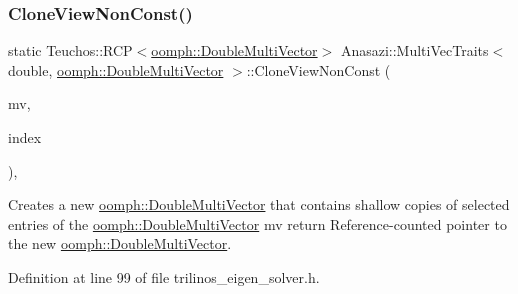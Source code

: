 \subsubsection{\texorpdfstring{Clone\+View\+Non\+Const()}{CloneViewNonConst()}\hspace{0.1cm}{\footnotesize\ttfamily [1/2]}}
{\footnotesize\ttfamily static Teuchos\+::\+R\+CP$<$\hyperlink{classoomph_1_1DoubleMultiVector}{oomph\+::\+Double\+Multi\+Vector}$>$ Anasazi\+::\+Multi\+Vec\+Traits$<$ double, \hyperlink{classoomph_1_1DoubleMultiVector}{oomph\+::\+Double\+Multi\+Vector} $>$\+::Clone\+View\+Non\+Const (\begin{DoxyParamCaption}\item[{\hyperlink{classoomph_1_1DoubleMultiVector}{oomph\+::\+Double\+Multi\+Vector} \&}]{mv,  }\item[{const std\+::vector$<$ int $>$ \&}]{index }\end{DoxyParamCaption})\hspace{0.3cm}{\ttfamily [inline]}, {\ttfamily [static]}}



Creates a new \hyperlink{classoomph_1_1DoubleMultiVector}{oomph\+::\+Double\+Multi\+Vector} that contains shallow copies of selected entries of the \hyperlink{classoomph_1_1DoubleMultiVector}{oomph\+::\+Double\+Multi\+Vector} mv return Reference-\/counted pointer to the new \hyperlink{classoomph_1_1DoubleMultiVector}{oomph\+::\+Double\+Multi\+Vector}. 



Definition at line 99 of file trilinos\+\_\+eigen\+\_\+solver.\+h.

\mbox{\label{classAnasazi_1_1MultiVecTraits_3_01double_00_01oomph_1_1DoubleMultiVector_01_4_ac62500686b329e6fccfd97356a31ca8e}} 
